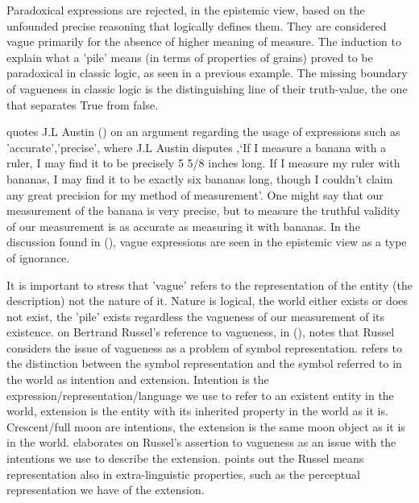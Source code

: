 Paradoxical expressions are rejected, in the epistemic view, based on the unfounded precise reasoning that logically defines them. They are considered vague primarily for the absence of higher meaning of measure. The induction to explain what a 'pile'  means (in terms of properties of grains) proved to be paradoxical in classic logic, as seen in a previous example. The missing boundary of vagueness in classic logic is the distinguishing line of their truth-value, the one that separates True from false. 

\cite{williamson2002vagueness} quotes J.L Austin (\cite{austin1962sense}) on an argument regarding the usage of expressions such as 'accurate','precise', where J.L Austin disputes ,‘If I measure a banana with a ruler, I may find it to be precisely 5 5/8 inches long. If I measure my ruler with bananas, I may find it to be exactly six bananas long, though I couldn’t claim any great precision for my method of measurement’. One might say that our measurement of the banana is very precise, but to measure the truthful validity of our measurement is as accurate as measuring it with bananas. In the discussion found in (\cite{williamson2002vagueness}), vague expressions are seen in the epistemic view as a type of ignorance. 

It is important to stress that 'vague' refers to the representation of the entity (the description) not  the nature of it. Nature is logical, the world either exists or does not exist, the 'pile' exists regardless the vagueness of our measurement of its existence.  \cite{williamson2002vagueness} on Bertrand Russel's reference to vagueness, in  (\cite{russell1923vagueness}),  notes that Russel considers the issue of vagueness as a problem of symbol representation. \cite{quine2011two} refers to the distinction between the symbol representation and the symbol referred to in the world as intention and extension. Intention is the expression/representation/language we use to refer to an existent entity in the world, extension is the entity with its inherited property in the world as it is. Crescent/full moon are intentions, the extension is the same moon object as it is in the world. \cite{quine2011two} elaborates on Russel's assertion to vagueness as an issue with the intentions we use to describe the extension. \cite{williamson2002vagueness} points out the Russel means representation also in extra-linguistic properties, such as the perceptual representation we have of the extension. 


